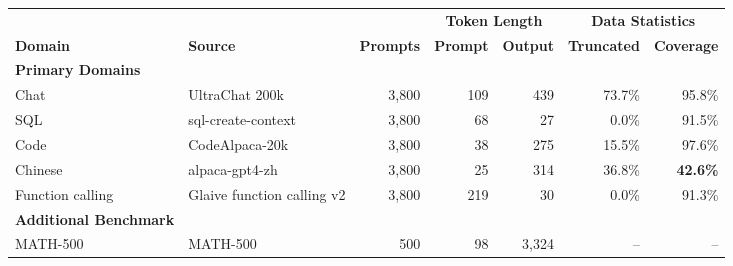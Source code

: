 
\begingroup
\renewcommand{\arraystretch}{1.18}
\setlength{\tabcolsep}{3.5pt}

\begin{tabularx}{\linewidth}{@{}
    l
    >{\raggedright\arraybackslash}X
    rrrrr@{}}
\toprule

&
&
&
\multicolumn{2}{c}{\textbf{Token Length}}
&
\multicolumn{2}{c}{\textbf{Data Statistics}} \\

\cmidrule(lr){4-5}
\cmidrule(l){6-7}

\textbf{Domain}
& \textbf{Source}
& \textbf{Prompts}
& \textbf{Prompt}
& \textbf{Output}
& \textbf{Truncated}
& \textbf{Coverage} \\

\midrule

\rowcolor{tabGroup}
\textbf{\footnotesize Primary Domains}
& & & & & & \\

Chat
& UltraChat 200k \citep{ding2023ultrachat}
& 3{,}800
& 109
& 439
& 73.7\%
& 95.8\% \\

SQL
& sql-create-context \citep{sqlcreatecontext}
& 3{,}800
& 68
& 27
& 0.0\%
& 91.5\% \\

Code
& CodeAlpaca-20k \citep{codealpaca}
& 3{,}800
& 38
& 275
& 15.5\%
& 97.6\% \\

Chinese
& alpaca-gpt4-zh \citep{peng2023gpt4instruct}
& 3{,}800
& 25
& 314
& 36.8\%
& \cellcolor{tabHighlight}\textbf{42.6\%} \\

Function calling
& Glaive function calling v2 \citep{glaivefc}
& 3{,}800
& 219
& 30
& 0.0\%
& 91.3\% \\

\addlinespace[3pt]

\rowcolor{tabGroup}
\textbf{\footnotesize Additional Benchmark}
& & & & & & \\

MATH-500
& MATH-500 \citep{lightman2023verify}
& 500
& 98
& 3{,}324
& --
& -- \\

\bottomrule
\end{tabularx}
\endgroup
